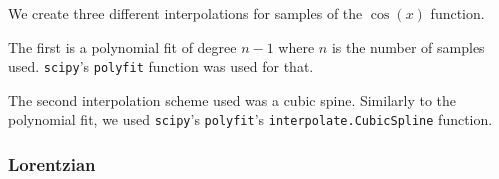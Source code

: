 \documentclass[
]{article}
\begin{document}
We create three different interpolations for samples of the \(\cos (x)\)
function.

The first is a polynomial fit of degree \(n-1\) where \(n\) is the
number of samples used. \texttt{scipy}'s \texttt{polyfit} function was
used for that.

The second interpolation scheme used was a cubic spine. Similarly to the
polynomial fit, we used \texttt{scipy}'s \texttt{polyfit}'s
\texttt{interpolate.CubicSpline} function.

\hypertarget{lorentzian}{%
\subsubsection{Lorentzian}\label{lorentzian}}
\end{document}
